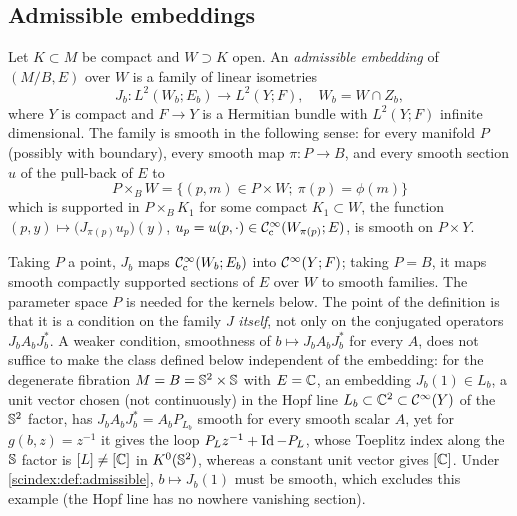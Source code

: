 \subsection{Admissible embeddings}
\begin{definition}\label{scindex:def:admissible}
  Let $K\subset M$ be compact and $W\supset K$ open. An \emph{admissible
  embedding} of $(M/B,E)$ over $W$ is a family of linear isometries
  \begin{equation*}
    J_b:L^2(W_b;E_b)\longrightarrow L^2(Y;F),\quad W_b=W\cap Z_b,
  \end{equation*}
  where $Y$ is compact and $F\to Y$ is a Hermitian bundle with
  $L^2(Y;F)$ infinite dimensional. The family is smooth in the following sense:
  for every manifold
  $P$ (possibly with boundary), every smooth map $\pi:P\to B$, and every smooth
  section $u$ of the pull-back of $E$ to
  \begin{equation*}
    P\times_BW=\{(p,m)\in P\times W;\ \pi(p)=\phi(m)\}
  \end{equation*}
  which is supported in $P\times_BK_1$ for some compact $K_1\subset W$, the
  function $(p,y)\mapsto\bigl(J_{\pi(p)}u_p\bigr)(y)$, $u_p=u(p,\cdot)\in
  \mathcal{C}^\infty_{\mathrm{c}}(W_{\pi(p)};E)$, is smooth on $P\times Y$.
\end{definition}

Taking $P$ a point, $J_b$ maps $\mathcal{C}^\infty_{\mathrm{c}}(W_b;E_b)$ into $\mathcal{C}^\infty(Y;F)$; taking $P=B$, it
maps smooth compactly supported sections of $E$ over $W$ to smooth families. The
parameter space $P$ is needed for the kernels below. The point of the definition
is that it is a condition on the family $J$ \emph{itself}, not only on the
conjugated operators $J_bA_bJ_b^*$. A weaker condition, smoothness of
$b\mapsto J_bA_bJ_b^*$ for every $A$, does not suffice to make the class
defined below independent of the embedding: for the degenerate fibration
$M=B=\mathbb{S}^2\times\mathbb{S}$ with $E=\mathbb{C}$, an embedding $J_b(1)\in L_b$, a unit
vector chosen (not continuously) in the Hopf line $L_b\subset\mathbb{C}^2\subset
\mathcal{C}^\infty(Y)$ of the $\mathbb{S}^2$ factor, has $J_bA_bJ_b^*=A_bP_{L_b}$ smooth for
every smooth scalar $A$, yet for $g(b,z)=z^{-1}$ it gives the loop
$P_Lz^{-1}+\operatorname{Id}-P_L$, whose Toeplitz index along the $\mathbb{S}$ factor is
$[L]\ne[\mathbb{C}]$ in $K^0(\mathbb{S}^2)$, whereas a constant unit vector gives $[\mathbb{C}]$.
Under \cref{scindex:def:admissible}, $b\mapsto J_b(1)$ must be smooth, which
excludes this example (the Hopf line has no nowhere vanishing section).

